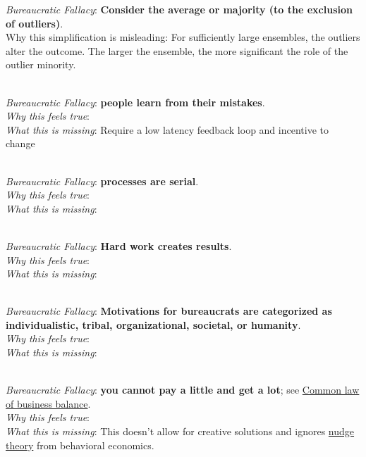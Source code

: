 \textit{Bureaucratic Fallacy}: \textbf{Consider the average or majority (to the exclusion of outliers)}. \\
Why this simplification is misleading: For sufficiently large ensembles, the outliers alter the outcome. The larger the ensemble, the more significant the role of the outlier minority.

\ \\

\textit{Bureaucratic Fallacy}: \textbf{people learn from their mistakes}. \\
\textit{Why this feels true}: \\
\textit{What this is missing}: Require a low latency feedback loop and incentive to change

\ \\

\textit{Bureaucratic Fallacy}: \textbf{processes are serial}.\\
\textit{Why this feels true}: \\
\textit{What this is missing}: 


\ \\

\textit{Bureaucratic Fallacy}: \textbf{Hard work creates results}.\\
\textit{Why this feels true}: \\
\textit{What this is missing}: 


\ \\

\textit{Bureaucratic Fallacy}: \textbf{Motivations for bureaucrats are categorized as individualistic, tribal, organizational, societal, or humanity}.\\
\textit{Why this feels true}: \\
\textit{What this is missing}: 


\ \\

\textit{Bureaucratic Fallacy}: \textbf{you cannot pay a little and get a lot}; see \href{https://en.wikipedia.org/wiki/Common_law_of_business_balance}{Common law of business balance}. \\
\textit{Why this feels true}: \\
\textit{What this is missing}: This doesn't allow for creative solutions and ignores \href{https://en.wikipedia.org/wiki/Nudge_theory}{nudge theory} from behavioral economics. 

